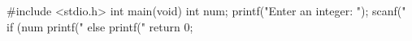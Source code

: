 #include <stdio.h>
int main(void)
{
    int num;
    printf("Enter an integer: ");
    scanf("%
    if (num %
        printf("%
    else
        printf("%
    return 0;
}
